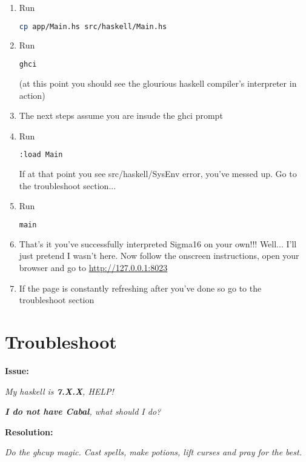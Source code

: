 \documentclass{article}
\begin{document}
\begin{enumerate}
   \item Run
         \begin{lstlisting}[language=Bash]
         cp app/Main.hs src/haskell/Main.hs
\end{lstlisting}
   \item Run 
         \begin{lstlisting}[language=Bash]
         ghci
\end{lstlisting} (at this point you should see the glourious haskell compiler's interpreter in action)
   \item The next steps assume you are insude the ghci prompt
   \item Run 
         \begin{lstlisting}[language=Bash]
         :load Main
\end{lstlisting}
If at that point you see src/haskell/SysEnv error, you've messed up. Go to the troubleshoot section...
   \item Run 
         \begin{lstlisting}[language=Bash]
         main
\end{lstlisting}
   \item That's it you've successfully interpreted Sigma16 on your own!!! Well... I'll just pretend I wasn't here. Now follow the onscreen instructions, open your browser and go to \url{http://127.0.0.1:8023}
   \item If the page is constantly refreshing after you've done so go to the troubleshoot section

 \end{enumerate}

\section{Troubleshoot}

 \textbf{Issue:}
 
\textit{ My haskell is \textbf{7.X.X}, HELP!}
 
\textit{ \textbf{I do not have Cabal}, what should I do?}

\textbf{Resolution:}
 
        \textit{Do the ghcup magic. Cast spells, make potions, lift curses and pray for the best.}
        
\end{document}
